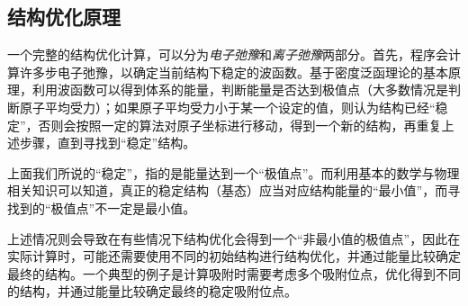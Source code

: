 \subsection{结构优化原理}\label{subsec:为什么要进行结构优化-结构优化原理}

一个完整的结构优化计算，可以分为\emph{电子弛豫}和\emph{离子弛豫}两部分。首先，程序会计算许多步电子弛豫，以确定当前结构下稳定的波函数。基于密度泛函理论的基本原理，利用波函数可以得到体系的能量，判断能量是否达到极值点（大多数情况是判断原子平均受力）；如果原子平均受力小于某一个设定的值，则认为结构已经“稳定”，否则会按照一定的算法对原子坐标进行移动，得到一个新的结构，再重复上述步骤，直到寻找到“稳定”结构。

\begin{attention}
    上面我们所说的“稳定”，指的是能量达到一个“极值点”。而利用基本的数学与物理相关知识可以知道，真正的稳定结构（基态）应当对应结构能量的“最小值”，而寻找到的“极值点”不一定是最小值。

    上述情况则会导致在有些情况下结构优化会得到一个“非最小值的极值点”，因此在实际计算时，可能还需要使用不同的初始结构进行结构优化，并通过能量比较确定最终的结构。一个典型的例子是计算吸附时需要考虑多个吸附位点，优化得到不同的结构，并通过能量比较确定最终的稳定吸附位点。
\end{attention}
